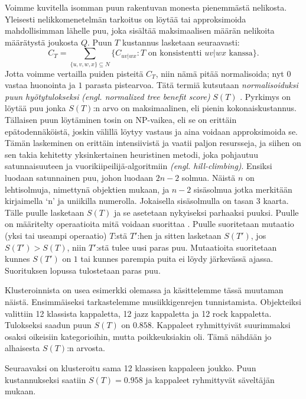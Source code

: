 \documentclass[12pt,finnish]{tktltiki2}
\theoremstyle{definition}
\theoremstyle{remark}
\newcommand{\engl}[1]{\emph{(engl. #1)}}
\begin{document}
    Voimme kuvitella isomman puun rakentuvan monesta pienemmästä nelikosta. Yleisesti nelikkomenetelmän tarkoitus on löytää tai approksimoida mahdollisimman lähelle puu, joka sisältää maksimaalisen määrän nelikoita määrätystä joukosta $Q$. Puun $T$ kustannus lasketaan seuraavasti:
    \[
      C_{T} = \sum_{\{u,v,w,x\}\subseteq N}\{C_{uv|wx}: T \text{ on konsistentti } uv|wx \text{ kanssa}\}.
    \]
    Jotta voimme vertailla puiden pisteitä $C_{T}$, niin nämä pitää normalisoida; nyt $0$ vastaa huonointa ja $1$ parasta pistearvoa. Tätä termiä kutsutaan \emph{normalisoiduksi puun hyötytulokseksi} \engl{normalized tree benefit score} $S(T)$ \cite{CV05}.
    Pyrkimys on löytää puu jonka $S(T)$:n arvo on maksimaalinen, eli pienin kokonaiskustannus.
    Tällaisen puun löytäminen tosin on NP-vaikea, eli se on erittäin epätodennäköistä, joskin välillä löytyy vastaus ja aina voidaan approksimoida se.
    Tämän laskeminen on erittäin intensiivistä ja vaatii paljon resursseja, ja siihen on sen takia kehitetty yksinkertainen heuristinen metodi, joka pohjautuu satunnaisuuteen ja vuorikiipeilijä-algoritmiin \engl{hill-climbing}.
    Ensiksi luodaan satunnainen puu, johon luodaan $2n-2$ solmua. Näistä $n$ on lehtisolmuja, nimettynä objektien mukaan, ja $n-2$ sisäsolmua jotka merkitään kirjaimella `n' ja uniikilla numerolla. Jokaisella sisäsolmulla on tasan 3 kaarta. Tälle puulle lasketaan $S(T)$ ja se asetetaan nykyiseksi parhaaksi puuksi. Puulle on määritelty operaatioita mitä voidaan suorittaa \cite{CV05}.
    Puulle suoritetaan mutaatio (yksi tai useampi operaatio) $T$:stä $T'$:hen ja sitten lasketaan $S(T')$, jos $S(T') > S(T)$, niin $T'$:stä tulee uusi paras puu. Mutaatioita suoritetaan kunnes $S(T')$ on $1$ tai kunnes parempia puita ei löydy järkevässä ajassa. Suorituksen lopussa tulostetaan paras puu.


    Klusteroinnista on usea esimerkki olemassa ja käsittelemme tässä muutaman näistä.
    Ensimmäiseksi tarkastelemme musiikkigenrejen tunnistamista.
    Objekteiksi valittiin 12 klassista kappaletta, 12 jazz kappaletta ja 12 rock kappaletta.
    Tulokseksi saadun puun $S(T)$ on $0.858$. Kappaleet ryhmittyivät suurimmaksi osaksi oikeisiin kategorioihin, mutta poikkeuksiakin oli.
    Tämä nähdään jo alhaisesta $S(T)$:n arvosta.

    Seuraavaksi on klusteroitu sama 12 klassisen kappaleen joukko. Puun kustannukseksi saatiin $S(T)=0.958$ ja kappaleet ryhmittyvät säveltäjän mukaan.
\end{document}
